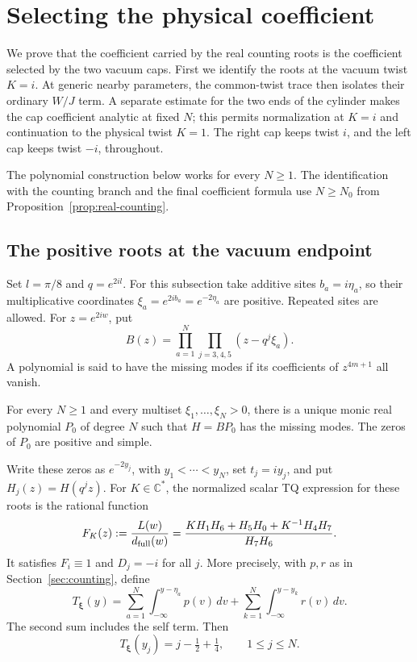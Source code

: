 \section{Selecting the physical coefficient}\label{sec:physical-amplitude}

We prove that the coefficient carried by the real counting roots is the coefficient selected by the two vacuum caps. First we identify the roots at the vacuum twist \(K=i\). At generic nearby parameters, the common-twist trace then isolates their ordinary \(W/J\) term. A separate estimate for the two ends of the cylinder makes the cap coefficient analytic at fixed \(N\); this permits normalization at \(K=i\) and continuation to the physical twist \(K=1\). The right cap keeps twist \(i\), and the left cap keeps twist \(-i\), throughout.

The polynomial construction below works for every \(N\ge1\). The identification with the counting branch and the final coefficient formula use \(N\ge N_0\) from Proposition~\ref{prop:real-counting}.

\subsection{The positive roots at the vacuum endpoint}

Set \(l=\pi/8\) and \(q=e^{2il}\). For this subsection take additive sites \(b_a=i\eta_a\), so their multiplicative coordinates
\(\xi_a=e^{2ib_a}=e^{-2\eta_a}\) are positive. Repeated sites are allowed. For \(z=e^{2iw}\), put
\[
 B(z)=\prod_{a=1}^N\prod_{j=3,4,5}(z-q^j\xi_a).
\]
A polynomial is said to have the missing modes if its coefficients of \(z^{4m+1}\) all vanish.

\begin{proposition}\label{prop:positive-vacuum-roots}
For every \(N\ge1\) and every multiset \(\xi_1,\ldots,\xi_N>0\), there is a unique monic real polynomial \(P_0\) of degree \(N\) such that \(H=BP_0\) has the missing modes. The zeros of \(P_0\) are positive and simple.

Write these zeros as \(e^{-2y_j}\), with \(y_1<\cdots<y_N\), set \(t_j=iy_j\), and put \(H_j(z)=H(q^jz)\). For \(K\in\mathbb C^*\), the normalized scalar TQ expression for these roots is the rational function
\begin{equation}\label{eq:vacuum-TQ-quotient}
 F_K(z):=\frac{L(w)}{d_{\rm full}(w)}
 =\frac{K H_1H_6+H_5H_0+K^{-1}H_4H_7}{H_7H_6}.
\end{equation}
It satisfies \(F_i\equiv1\) and \(D_j=-i\) for all \(j\). More precisely, with \(p,r\) as in Section~\ref{sec:counting}, define
\[
 T_{\boldsymbol\xi}(y)
 =\sum_{a=1}^N\int_{-\infty}^{y-\eta_a}p(v)\,dv
   +\sum_{k=1}^N\int_{-\infty}^{y-y_k}r(v)\,dv .
\]
The second sum includes the self term. Then
\[
 T_{\boldsymbol\xi}(y_j)=j-\tfrac12+\tfrac14,\qquad 1\le j\le N .
\]
\end{proposition}

